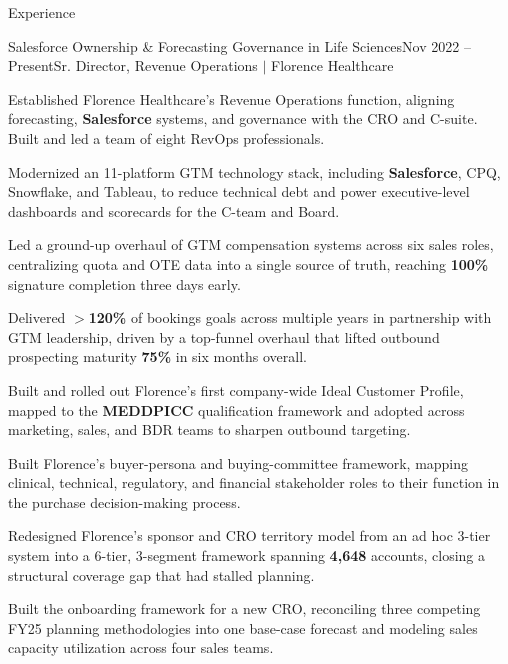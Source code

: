 \documentclass{resume}
\begin{document}
\begin{rSection}{Experience}

\begin{rSubsection}{Salesforce Ownership \& Forecasting Governance in Life Sciences}{\textcolor{black!60}{Nov 2022 -- Present}}{Sr. Director, Revenue Operations $\vert$ Florence Healthcare}{}
\item Established Florence Healthcare's Revenue Operations function, aligning forecasting, \textbf{Salesforce} systems, and governance with the CRO and C-suite. Built and led a team of eight RevOps professionals.
\item Modernized an 11-platform GTM technology stack, including \textbf{Salesforce}, CPQ, Snowflake, and Tableau, to reduce technical debt and power executive-level dashboards and scorecards for the C-team and Board.
\item Led a ground-up overhaul of GTM compensation systems across six sales roles, centralizing quota and OTE data into a single source of truth, reaching \textbf{100\%} signature completion three days early.
\item Delivered $>$\textbf{120\%} of bookings goals across multiple years in partnership with GTM leadership, driven by a top-funnel overhaul that lifted outbound prospecting maturity \textbf{75\%} in six months overall.
\item Built and rolled out Florence's first company-wide Ideal Customer Profile, mapped to the \textbf{MEDDPICC} qualification framework and adopted across marketing, sales, and BDR teams to sharpen outbound targeting.
\item Built Florence's buyer-persona and buying-committee framework, mapping clinical, technical, regulatory, and financial stakeholder roles to their function in the purchase decision-making process.
\item Redesigned Florence's sponsor and CRO territory model from an ad hoc 3-tier system into a 6-tier, 3-segment framework spanning \textbf{4,648} accounts, closing a structural coverage gap that had stalled planning.
\item Built the onboarding framework for a new CRO, reconciling three competing FY25 planning methodologies into one base-case forecast and modeling sales capacity utilization across four sales teams.

\end{rSubsection}
\end{rSection}
\end{document}
